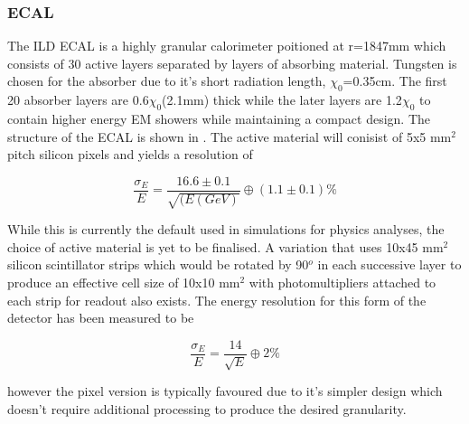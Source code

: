 \subsubsection{ECAL}
The \ac{ILD} \ac{ECAL} is a highly granular calorimeter poitioned at r=1847mm which consists of 30 active layers separated by layers of absorbing material. Tungsten is chosen for the absorber due to it's short radiation length, $\chi_0$=0.35cm. The first 20 absorber layers are 0.6$\chi_0$(2.1mm) thick while the later layers are  1.2$\chi_0$ to contain higher energy \ac{EM} showers while maintaining a compact design. The structure of the \ac{ECAL} is shown in . The active material will conisist of 5x5 mm$^2$ pitch silicon pixels and yields a resolution of

\begin{equation}
  \frac{\sigma_E}{E}=\frac{16.6\pm 0.1}{\sqrt{(E(GeV)}}\oplus(1.1\pm 0.1)\%
\end{equation}

While this is currently the default used in simulations for physics analyses, the choice of active material is yet to be finalised. A variation that uses 10x45 mm$^2$ silicon scintillator strips which would be rotated by 90${^o}$ in each successive layer to produce an effective cell size of 10x10 mm$^2$ with photomultipliers attached to each strip for readout also exists. The energy resolution for this form of the detector has been measured to be

\begin{equation}
  \frac{\sigma_E}{E}=\frac{14}{\sqrt{E}}\oplus2\%
\end{equation}

however the pixel version is typically favoured due to it's simpler design which doesn't require additional processing to produce the desired granularity.


